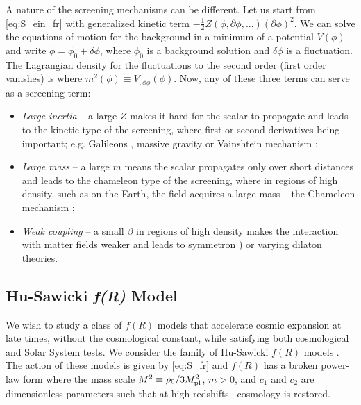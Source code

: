 A nature of the screening mechanisms can be different. Let us start from \eqref{eq:S_ein_fr} with generalized kinetic term $-\frac12 Z(\phi,\partial\phi,...)(\partial\phi)^2$. We can solve the equations of motion for the background in a minimum of a potential $V(\phi)$ and write $\phi=\phi_0+\delta\phi$, where $\phi_0$ is a background solution and $\delta\phi$ is a fluctuation. The Lagrangian density for the fluctuations to the second order (first order vanishes) is
where $m^2(\phi)\equiv V_{,\phi\phi}(\phi)$. Now, any of these three terms can serve as a screening term:
\begin{itemize}
	\item  \textit{Large inertia} -- a large $Z$ makes it hard for the scalar to propagate and leads to the kinetic type of the screening, where first or second derivatives being important; e.g. Galileons \parencite{2009PhRvD..79f4036N}, massive gravity \parencite{2012RvMP...84..671H} or Vainshtein mechanism \parencite{2013CQGra..30r4001B};
	\item \textit{Large mass} --  a large $m$ means the scalar propagates only over short distances and leads to the chameleon type of the screening, where in regions of high density, such as on the Earth, the field acquires a large mass -- the Chameleon mechanism \parencite{Waterhouse:2006wv};
	\item \textit{Weak coupling} -- a small $\beta$ in regions of high density makes the interaction with matter fields weaker and leads to symmetron \parencite{2010PhRvL.104w1301H}) or varying dilaton \parencite{Damour:1994zq,2011PhRvD..83j4026B} theories.
\end{itemize}
\subsection{Hu-Sawicki \texorpdfstring{\textit{\lowercase{f}(R)}}{fR} Model}
We wish to study a class of $f(R)$ models that accelerate cosmic expansion at late times, without the cosmological constant, while satisfying both cosmological and Solar System tests. We consider the family of Hu-Sawicki $f(R)$ models \parencite{Hu-Saw}. The action of these models is given by \eqref{eq:S_fr} and $f(R)$ has a broken power-law form
where the mass scale $M^2\equiv\bar\rho_0/3M_{\text{\scriptsize pl}}^2$, $m>0$, and $c_1$ and $c_2$ are dimensionless parameters such that at high redshifts \LCDM\ cosmology is restored.

